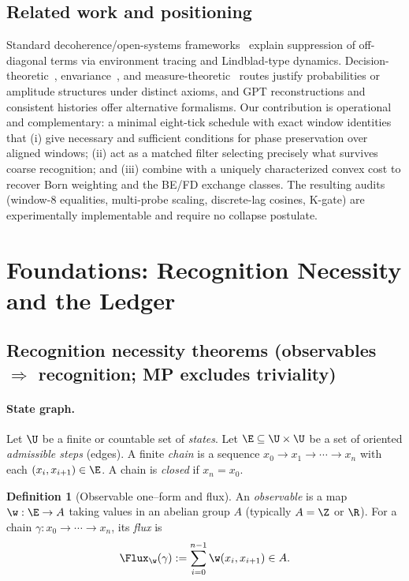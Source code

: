 \documentclass[12pt,a4paper]{article}
\theoremstyle{definition}
\newtheorem{definition}[theorem]{Definition}
\theoremstyle{remark}
\begin{document}
\subsection{Related work and positioning}
Standard decoherence/open-systems frameworks~\cite{Zurek2003,Joos2003} explain suppression of off-diagonal terms via environment tracing and Lindblad-type dynamics. Decision-theoretic~\cite{Deutsch1999,Wallace2012}, envariance~\cite{Zurek2005}, and measure-theoretic~\cite{Gleason1957} routes justify probabilities or amplitude structures under distinct axioms, and GPT reconstructions and consistent histories offer alternative formalisms. Our contribution is operational and complementary: a minimal eight-tick schedule with exact window identities that (i) give necessary and sufficient conditions for phase preservation over aligned windows; (ii) act as a matched filter selecting precisely what survives coarse recognition; and (iii) combine with a uniquely characterized convex cost to recover Born weighting and the BE/FD exchange classes. The resulting audits (window-8 equalities, multi-probe scaling, discrete-lag cosines, K-gate) are experimentally implementable and require no collapse postulate.

\section{Foundations: Recognition Necessity and the Ledger}

\subsection{Recognition necessity theorems (observables $\Rightarrow$ recognition; MP excludes triviality)}
\label{subsec:necessity}

\paragraph{State graph.}
Let $\U$ be a finite or countable set of \emph{states}. Let $\E\subseteq \U\times\U$ be a set of oriented \emph{admissible steps} (edges). A finite \emph{chain} is a sequence $x_0\to x_1\to\cdots\to x_n$ with each $(x_{i},x_{i+1})\in \E$. A chain is \emph{closed} if $x_n=x_0$.

\begin{definition}[Observable one--form and flux]
An \emph{observable} is a map $\w:\E\to A$ taking values in an abelian group $A$ (typically $A=\Z$ or $\R$). For a chain $\gamma:x_0\to\cdots\to x_n$, its \emph{flux} is
\[
  \Flux_{\w}(\gamma) := \sum_{i=0}^{n-1}\w(x_i,x_{i+1})\in A.
\]
\end{definition}
\end{document}
